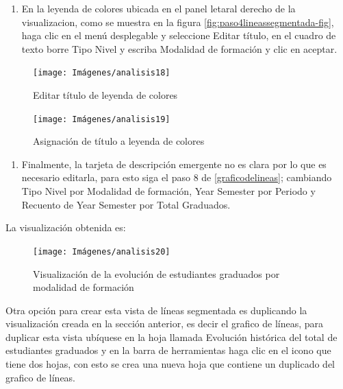 \documentclass[
]{book}
\providecommand{\tightlist}{%
  \setlength{\itemsep}{0pt}\setlength{\parskip}{0pt}}
\begin{document}
\begin{enumerate}
\def\labelenumi{\arabic{enumi}.}
\setcounter{enumi}{5}
\tightlist
\item
  En la leyenda de colores ubicada en el panel letaral derecho de la visualizacion, como se muestra en la figura \ref{fig:paso4lineassegmentada-fig}, haga clic en el menú desplegable y seleccione Editar título, en el cuadro de texto borre Tipo Nivel y escriba Modalidad de formación y clic en aceptar.
\end{enumerate}

\begin{figure}

{\centering \texttt{[image: Imágenes/analisis18]} 

}

\caption{Editar título de leyenda de colores}\label{fig:paso6lineassegmentada-fig}
\end{figure}

\begin{figure}

{\centering \texttt{[image: Imágenes/analisis19]} 

}

\caption{Asignación de título a leyenda de colores}\label{fig:paso6-1lineassegmentada-fig}
\end{figure}

\begin{enumerate}
\def\labelenumi{\arabic{enumi}.}
\setcounter{enumi}{6}
\tightlist
\item
  Finalmente, la tarjeta de descripción emergente no es clara por lo que es necesario editarla, para esto siga el paso 8 de \ref{graficodelineas}; cambiando Tipo Nivel por Modalidad de formación, Year Semester por Periodo y Recuento de Year Semester por Total Graduados.
\end{enumerate}

La visualización obtenida es:

\begin{figure}

{\centering \texttt{[image: Imágenes/analisis20]} 

}

\caption{Visualización de la evolución de estudiantes graduados por modalidad de formación}\label{fig:lineassegmentada-fig}
\end{figure}

Otra opción para crear esta vista de líneas segmentada es duplicando la visualización creada en la sección anterior, es decir el grafico de líneas, para duplicar esta vista ubíquese en la hoja llamada Evolución histórica del total de estudiantes graduados y en la barra de herramientas haga clic en el icono que tiene dos hojas, con esto se crea una nueva hoja que contiene un duplicado del grafico de líneas.
\end{document}

